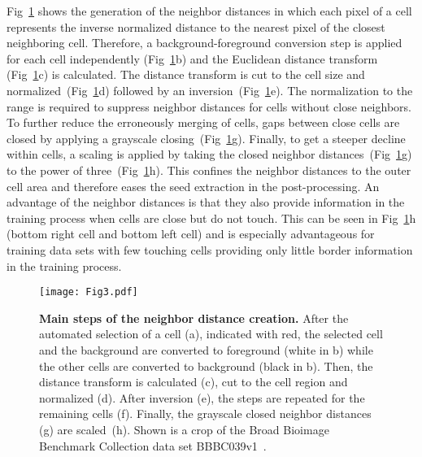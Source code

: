\documentclass[10pt,letterpaper]{article}
\begin{document}
Fig~\ref{fig:label-creation} shows the generation of the neighbor distances in which each pixel of a cell represents the inverse normalized distance to the nearest pixel of the closest neighboring cell. Therefore, a background-foreground conversion step is applied for each cell independently (Fig~\ref{fig:label-creation}b) and the Euclidean distance transform (Fig~\ref{fig:label-creation}c) is calculated. The distance transform is cut to the cell size and normalized~(Fig~\ref{fig:label-creation}d) followed by an inversion~(Fig~\ref{fig:label-creation}e). The normalization to the range  is required to suppress neighbor distances for cells without close neighbors. To further reduce the erroneously merging of cells, gaps between close cells are closed by applying a grayscale closing~(Fig~\ref{fig:label-creation}g). Finally, to get a steeper decline within cells, a scaling is applied by taking the closed neighbor distances~(Fig~\ref{fig:label-creation}g) to the power of three~(Fig~\ref{fig:label-creation}h). This confines the neighbor distances to the outer cell area and therefore eases the seed extraction in the post-processing. An advantage of the neighbor distances is that they also provide information in the training process when cells are close but do not touch. This can be seen in Fig~\ref{fig:label-creation}h (bottom right cell and bottom left cell) and is especially advantageous for training data sets with few touching cells providing only little border information in the training process.
\begin{figure}
\begin{adjustwidth}{-2.25in}{0in}
\centering
\texttt{[image: Fig3.pdf]}
\caption{\textbf{Main steps of the neighbor distance creation.} After the automated selection of a cell (a), indicated with red, the selected cell and the background are converted to foreground (white in b) while the other cells are converted to background (black in b). Then, the distance transform is calculated (c), cut to the cell region and normalized (d). After inversion (e), the steps are repeated for the remaining cells (f). Finally, the grayscale closed neighbor distances (g) are scaled~(h). Shown is a crop of the Broad Bioimage Benchmark Collection data set BBBC039v1~\cite{Ljosa2012}.}
\label{fig:label-creation}
\end{adjustwidth}
\end{figure}
\end{document}
